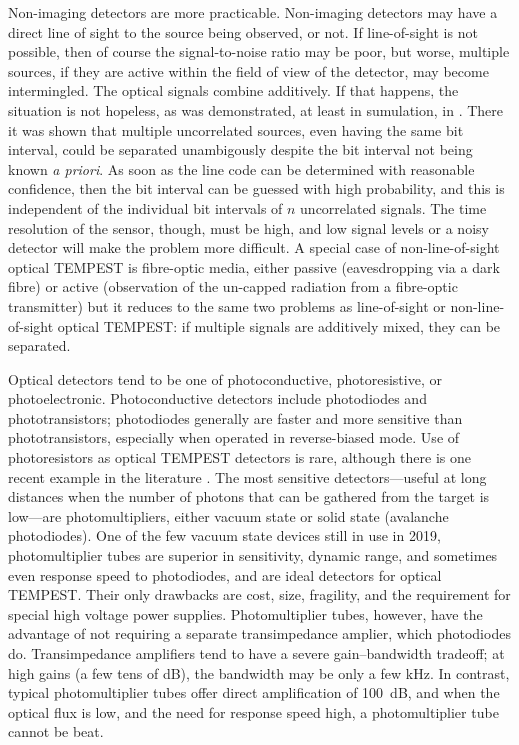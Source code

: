 \documentclass[a4paper,twoside,11pt]{book}
\begin{document}
Non-imaging detectors are more practicable. Non-imaging detectors may have a
direct line of sight to the source being observed, or not. If line-of-sight is
not possible, then of course the signal-to-noise ratio may be poor, but worse,
multiple sources, if they are active within the field of view of the detector,
may become intermingled. The optical signals combine additively. If that
happens, the situation is not hopeless, as was demonstrated, at least in
sumulation, in \cite[\S 8]{Loughry2002a}. There it was shown that multiple
uncorrelated sources, even having the same bit interval, could be separated
unambigously despite the bit interval not being known {\it a priori}. As soon
as the line code can be determined with reasonable confidence, then the bit
interval can be guessed with high probability, and this is independent of the
individual bit intervals of $n$ uncorrelated signals. The time resolution of
the sensor, though, must be high, and low signal levels or a noisy detector
will make the problem more difficult. A special case of non-line-of-sight
optical TEMPEST is fibre-optic media, either passive (eavesdropping via a dark
fibre) or active (observation of the un-capped radiation from a fibre-optic
transmitter) but it reduces to the same two problems as line-of-sight or
non-line-of-sight optical TEMPEST: if multiple signals are additively mixed,
they can be separated.

Optical detectors tend to be one of photoconductive, photoresistive, or
photoelectronic. Photoconductive detectors include photodiodes and
phototransistors; photodiodes generally are faster and more sensitive than
phototransistors, especially when operated in reverse-biased mode. Use of
photoresistors as optical TEMPEST detectors is rare, although there is one
recent example in the literature \cite{Barisani2009a}. The most sensitive
detectors---useful at long distances when the number of photons that can be
gathered from the target is low---are photomultipliers, either vacuum state or
solid state (avalanche photodiodes). One of the few vacuum state devices still
in use in 2019, photomultiplier tubes are superior in sensitivity, dynamic
range, and sometimes even response speed to photodiodes, and are ideal
detectors for optical TEMPEST. Their only drawbacks are cost, size, fragility,
and the requirement for special high voltage power supplies. Photomultiplier
tubes, however, have the advantage of not requiring a separate transimpedance
amplier, which photodiodes do. Transimpedance amplifiers tend to have a severe
gain--bandwidth tradeoff; at high gains (a few tens of \si{\deci\bel}), the
bandwidth may be only a few \si{\kilo\hertz}. In contrast, typical
photomultiplier tubes offer direct amplification of \SI{100}{\deci\bel}, and
when the optical flux is low, and the need for response speed high, a
photomultiplier tube cannot be beat.
\end{document}
